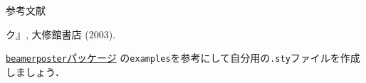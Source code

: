 \documentclass[unicode,colorlinks]{beamer}
\begin{document}
\begin{frame}[fragile]
\begin{columns}[t]
\begin{column}{.32\linewidth}
\begin{block}{参考文献}
\begin{enumerate}
                    ク』, 大修館書店 (2003).
            \end{enumerate}
        \end{block}

        \href{https://github.com/deselaers/latex-beamerposter}{\texttt{beamerposter}パッケージ}
        の\texttt{examples}を参考にして自分用の\texttt{.sty}ファイルを作成しましょう．
    \end{column}
\end{columns}
\end{frame}
\end{document}
